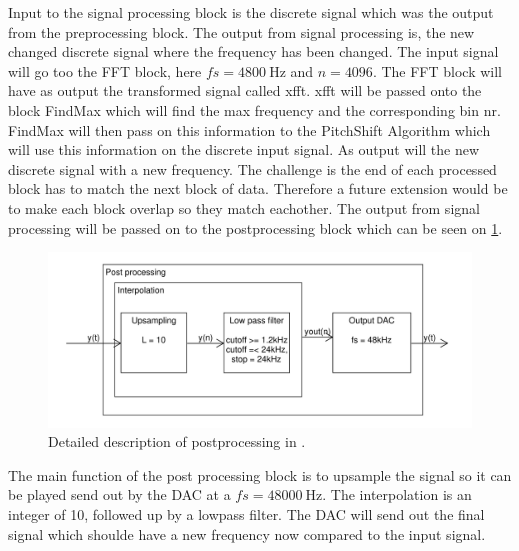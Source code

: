 Input to the signal processing block is the discrete signal which was the output from the preprocessing block. The output from signal processing is, the new changed discrete signal where the frequency has been changed. The input signal will go too the FFT block, here $fs=\SI{4800}{\hertz}$ and $n=4096$. The FFT block will have as output the transformed signal called xfft. xfft will be passed onto the block FindMax which will find the max frequency and the corresponding bin nr. FindMax will then pass on this information to the PitchShift Algorithm which will use this information on the discrete input signal. As output will the new discrete signal with a new frequency. The challenge is the end of each processed block has to match the next block of data. Therefore a future extension would be to make each block overlap so they match eachother. The output from signal processing will be passed on to the postprocessing block which can be seen on \cref{fig:DetailedDesign_postpro}. 

\begin{figure}
	\centering
	\includegraphics[width=1\linewidth]{gfx/Design/DesignDetailed_Postprocessing.pdf}
	\caption{Detailed description of postprocessing in \systemName.}
	\label{fig:DetailedDesign_postpro}
\end{figure}

The main function of the post processing block is to upsample the signal so it can be played send out by the DAC at a $fs=\SI{48000}{\hertz}$. The interpolation is an integer of 10, followed up by a lowpass filter. The DAC will send out the final signal which shoulde have a new frequency now compared to the input signal. 


\FloatBarrier